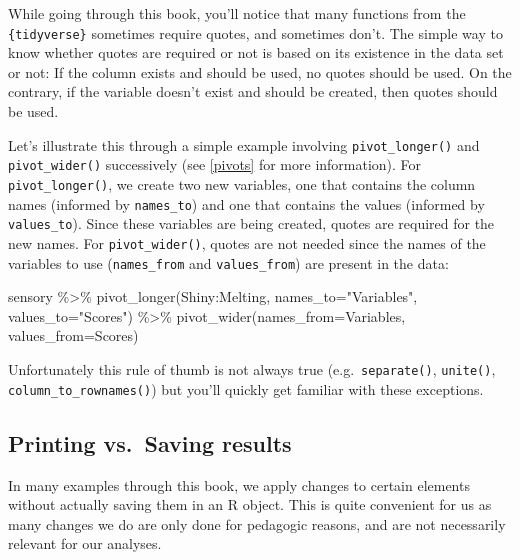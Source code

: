 \documentclass[
]{krantz}
\makeatletter
\newenvironment{Shaded}{\begin{snugshade}}{\end{snugshade}}
\newcommand{\AttributeTok}[1]{\textcolor[rgb]{0.61,0.61,0.61}{#1}}
\newcommand{\FunctionTok}[1]{\textcolor[rgb]{0,0,0}{#1}}
\newcommand{\NormalTok}[1]{#1}
\newcommand{\SpecialCharTok}[1]{\textcolor[rgb]{0,0,0}{#1}}
\newcommand{\StringTok}[1]{\textcolor[rgb]{0.5,0.5,0.5}{#1}}
\newenvironment{kframe}{%
\medskip{}
\setlength{\fboxsep}{.8em}
 \def\at@end@of@kframe{}%
 \ifinner\ifhmode%
  \def\at@end@of@kframe{\end{minipage}}%
  \begin{minipage}{\columnwidth}%
 \fi\fi%
 \def\FrameCommand##1{\hskip\@totalleftmargin \hskip-\fboxsep
 \colorbox{shadecolor}{##1}\hskip-\fboxsep
     \hskip-\linewidth \hskip-\@totalleftmargin \hskip\columnwidth}%
 \MakeFramed {\advance\hsize-\width
   \@totalleftmargin\z@ \linewidth\hsize
   \@setminipage}}%
 {\par\unskip\endMakeFramed%
 \at@end@of@kframe}
\renewenvironment{Shaded}{\begin{kframe}}{\end{kframe}}
\makeatother
\begin{document}
While going through this book, you'll notice that many functions from the \texttt{\{tidyverse\}} sometimes require quotes, and sometimes don't. The simple way to know whether quotes are required or not is based on its existence in the data set or not: If the column exists and should be used, no quotes should be used. On the contrary, if the variable doesn't exist and should be created, then quotes should be used.

Let's illustrate this through a simple example involving \texttt{pivot\_longer()} and \texttt{pivot\_wider()} successively (see \ref{pivots} for more information). For \texttt{pivot\_longer()}, we create two new variables, one that contains the column names (informed by \texttt{names\_to}) and one that contains the values (informed by \texttt{values\_to}). Since these variables are being created, quotes are required for the new names. For \texttt{pivot\_wider()}, quotes are not needed since the names of the variables to use (\texttt{names\_from} and \texttt{values\_from}) are present in the data:

\begin{Shaded}
\begin{Highlighting}[]
\NormalTok{sensory }\SpecialCharTok{\%\textgreater{}\%} 
  \FunctionTok{pivot\_longer}\NormalTok{(Shiny}\SpecialCharTok{:}\NormalTok{Melting, }\AttributeTok{names\_to=}\StringTok{"Variables"}\NormalTok{, }
               \AttributeTok{values\_to=}\StringTok{"Scores"}\NormalTok{) }\SpecialCharTok{\%\textgreater{}\%} 
  \FunctionTok{pivot\_wider}\NormalTok{(}\AttributeTok{names\_from=}\NormalTok{Variables, }\AttributeTok{values\_from=}\NormalTok{Scores)}
\end{Highlighting}
\end{Shaded}

Unfortunately this rule of thumb is not always true (e.g.~\texttt{separate()}, \texttt{unite()}, \texttt{column\_to\_rownames()}) but you'll quickly get familiar with these exceptions.

\hypertarget{print-save}{%
\subsection{Printing vs.~Saving results}\label{print-save}}

In many examples through this book, we apply changes to certain elements without actually saving them in an R object. This is quite convenient for us as many changes we do are only done for pedagogic reasons, and are not necessarily relevant for our analyses.
\end{document}
